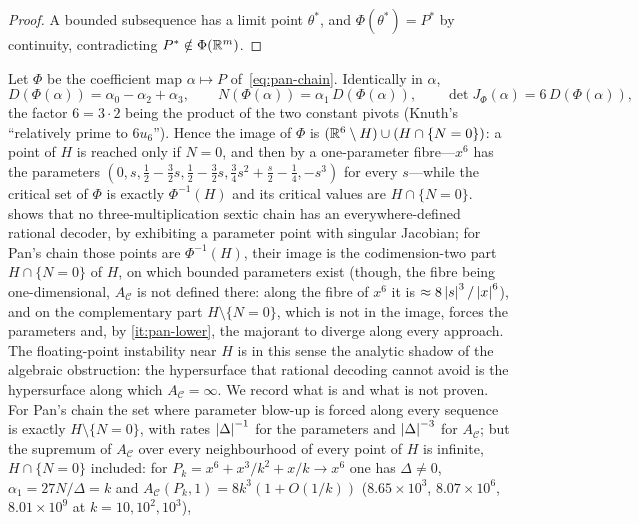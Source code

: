 \begin{proof}
A bounded subsequence has a limit point $\theta^*$, and
$\Phi(\theta^*)=P^*$ by continuity, contradicting $P^*\notin\Phi(\mathbb{R}^m)$.
\end{proof}

\begin{remark}
\label{rem:pan-lower-bound}
Let $\Phi$ be the coefficient map $\alpha\mapsto P$ of~\eqref{eq:pan-chain}.
Identically in $\alpha$,
\[
  D(\Phi(\alpha))=\alpha_0-\alpha_2+\alpha_3,\qquad
  N(\Phi(\alpha))=\alpha_1\,D(\Phi(\alpha)),\qquad
  \det J_\Phi(\alpha)=6\,D(\Phi(\alpha)) ,
\]
the factor $6=3\cdot2$ being the product of the two constant pivots (Knuth's
``relatively prime to $6u_6$'').  Hence the image of $\Phi$ is
$(\mathbb{R}^6\setminus H)\cup(H\cap\{N=0\})$: a point of $H$ is reached only if
$N=0$, and then by a one-parameter fibre---$x^6$ has the parameters
$(0,s,\tfrac12-\tfrac32s,\tfrac12-\tfrac32s,\tfrac34s^2+\tfrac s2-\tfrac14,-s^3)$
for every $s$---while the critical set of $\Phi$ is exactly $\Phi^{-1}(H)$
and its critical values are $H\cap\{N=0\}$.   shows
that no three-multiplication sextic chain has an everywhere-defined rational
decoder, by exhibiting a parameter point with singular Jacobian; for Pan's
chain those points are $\Phi^{-1}(H)$, their image is the codimension-two
part $H\cap\{N=0\}$ of $H$, on which bounded parameters exist (though, the
fibre being one-dimensional, $A_{\mathcal C}$ is not defined there: along the
fibre of $x^6$ it is $\approx8\left\lvert s\right\rvert^3/\left\lvert x\right\rvert^6$), and on the complementary
part $H\setminus\{N=0\}$, which is not in the image,
 forces the parameters and, by
\ref{it:pan-lower}, the majorant to diverge along
every approach.  The floating-point instability near $H$ is in this sense
the analytic shadow of the algebraic obstruction: the hypersurface that
rational decoding cannot avoid is the hypersurface along which
$A_{\mathcal C}=\infty$.  We record what is and what is not proven.  For
Pan's chain the set where parameter blow-up is forced along every sequence is
exactly $H\setminus\{N=0\}$, with rates $\left\lvert \Delta\right\rvert^{-1}$ for the parameters
and $\left\lvert \Delta\right\rvert^{-3}$ for $A_{\mathcal C}$; but the supremum of
$A_{\mathcal C}$ over every neighbourhood of every point of $H$ is infinite,
$H\cap\{N=0\}$ included: for $P_k=x^6+x^3/k^2+x/k\to x^6$ one has
$\Delta\ne0$, $\alpha_1=27N/\Delta=k$ and $A_{\mathcal C}(P_k,1)=8k^3(1+O(1/k))$
($8.65\times10^3$, $8.07\times10^6$, $8.01\times10^9$ at $k=10,10^2,10^3$),

\end{remark}
